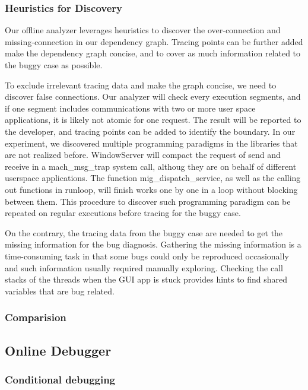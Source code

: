 \subsubsection{Heuristics for Discovery}
Our offline analyzer leverages heuristics to discover the over-connection and missing-connection in our dependency graph.
Tracing points can be further added make the dependency graph concise, and to cover as much information related to the buggy case as possible.\par
To exclude irrelevant tracing data and make the graph concise, we need to discover false connections.
Our analyzer will check every execution segments, and if one segment includes communications with two or more user space applications, it is likely not atomic for one request.
The result will be reported to the developer, and tracing points can be added to identify the boundary.
In our experiment, we discovered multiple programming paradigms in the libraries that are not realized before.
WindowServer will compact the request of send and receive in a mach\_msg\_trap system call, althoug they are on behalf of different userspace applications.
The function mig\_dispatch\_service, as well as the calling out functions in runloop, will finish works one by one in a loop without blocking between them.
This procedure to discover such programming paradigm can be repeated on regular executions before tracing for the buggy case.\par
On the contrary, the tracing data from the buggy case are needed to get the missing information for the bug diagnosis.
Gathering the missing information is a time-consuming task in that some bugs could only be reproduced occasionally and such information usually required manually exploring.
Checking the call stacks of the threads when the GUI app is stuck provides hints to find shared variables that are bug related.\par
\subsubsection{Comparision}

\subsection{Online Debugger}
\subsubsection{Conditional debugging}
